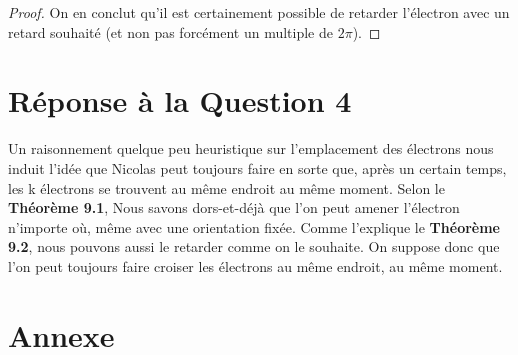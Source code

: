 \documentclass{amsart}
\theoremstyle{definition}
\theoremstyle{remark}
\numberwithin{equation}{section}
\begin{document}
\begin{proof}
  On en conclut qu'il est certainement possible de retarder l'électron avec un retard souhaité (et non pas forcément un multiple de $2\pi$).

\end{proof}

\section{Réponse à la Question 4}


Un raisonnement quelque peu heuristique sur l'emplacement des électrons nous induit l'idée que Nicolas peut toujours faire en sorte que, après un certain temps, les k électrons se trouvent au
même endroit au même moment. Selon le \textbf{Théorème 9.1}, Nous savons dors-et-déjà que l'on peut amener l'électron n'importe où, même avec une orientation fixée. Comme l'explique le \textbf{Théorème 9.2}, nous pouvons aussi 
le retarder comme on le souhaite. On suppose donc que l'on peut toujours faire croiser les électrons au même endroit, au même moment. 































































\newpage
\section{Annexe}
\end{document}
